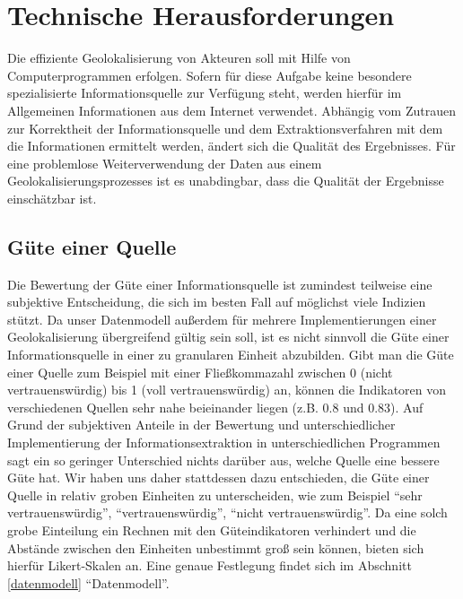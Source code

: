 \section{Technische Herausforderungen}
Die effiziente Geolokalisierung von Akteuren soll mit Hilfe von Computerprogrammen erfolgen. Sofern für diese Aufgabe keine besondere spezialisierte Informationsquelle zur Verfügung steht, werden hierfür im Allgemeinen Informationen aus dem Internet verwendet. Abhängig vom Zutrauen zur Korrektheit der Informationsquelle und dem Extraktionsverfahren mit dem die Informationen ermittelt werden, ändert sich die Qualität des Ergebnisses. Für eine problemlose Weiterverwendung der Daten aus einem Geolokalisierungsprozesses ist es unabdingbar, dass die Qualität der Ergebnisse einschätzbar ist.

\subsection{Güte einer Quelle}
Die Bewertung der Güte einer Informationsquelle ist zumindest teilweise eine subjektive Entscheidung, die sich im besten Fall auf möglichst viele Indizien stützt. Da unser Datenmodell außerdem für mehrere Implementierungen einer Geolokalisierung übergreifend gültig sein soll, ist es nicht sinnvoll die Güte einer Informationsquelle in einer zu granularen Einheit abzubilden. Gibt man die Güte einer Quelle zum Beispiel mit einer Fließkommazahl zwischen 0 (nicht vertrauenswürdig) bis 1 (voll vertrauenswürdig) an, können die Indikatoren von verschiedenen Quellen sehr nahe beieinander liegen (z.B. 0.8 und 0.83). Auf Grund der subjektiven Anteile in der Bewertung und unterschiedlicher Implementierung der Informationsextraktion in unterschiedlichen Programmen sagt ein so geringer Unterschied nichts darüber aus, welche Quelle eine bessere Güte hat. Wir haben uns daher stattdessen dazu entschieden, die Güte einer Quelle in relativ groben Einheiten zu unterscheiden, wie zum Beispiel ``sehr vertrauenswürdig'', ``vertrauenswürdig'', ``nicht vertrauenswürdig''. Da eine solch grobe Einteilung ein Rechnen\label{calc_likert} mit den Güteindikatoren verhindert und die Abstände zwischen den Einheiten unbestimmt groß sein können, bieten sich hierfür Likert-Skalen an. Eine genaue Festlegung findet sich im Abschnitt \ref{datenmodell} ``Datenmodell''.

